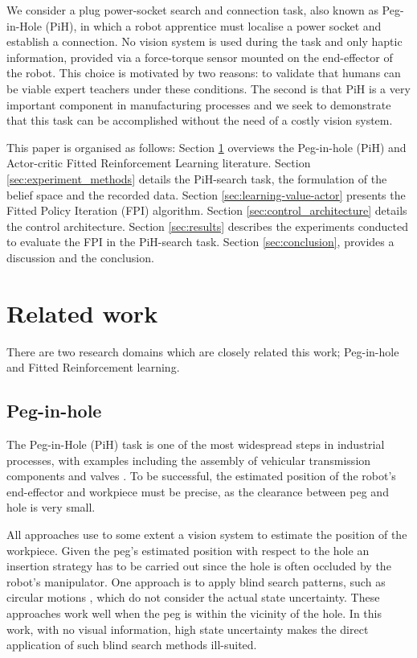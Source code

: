 \documentclass[final,5p,times,twocolumn]{elsarticle}
\begin{document}
We consider a plug power-socket search and connection task, also known as Peg-in-Hole (PiH), in which a 
robot apprentice must localise a power socket and establish a connection. 
No vision system is used during the task and only haptic information, provided via 
a force-torque sensor mounted on the end-effector of the robot. This choice is motivated by two reasons:
to validate that humans can be viable expert teachers under these conditions. The second is that PiH is a very important component 
in manufacturing processes and we seek to demonstrate that this task can be accomplished without the need of
a costly vision system. 

This paper is organised as follows: Section \ref{sec:related_work} overviews the 
Peg-in-hole (PiH) and Actor-critic Fitted Reinforcement Learning literature. Section \ref{sec:experiment_methods} 
details the PiH-search task, the formulation of the belief space and the recorded data. Section \ref{sec:learning-value-actor} presents the Fitted Policy Iteration (FPI) algorithm.
Section \ref{sec:control_architecture} details the control architecture. Section \ref{sec:results} describes the experiments 
conducted to evaluate the FPI in the PiH-search task. Section \ref{sec:conclusion}, provides a discussion and the conclusion.


\section{Related work}\label{sec:related_work}

There are two research domains which are closely related this work;
Peg-in-hole and Fitted Reinforcement learning.

\subsection{Peg-in-hole}

The Peg-in-Hole (PiH) task is one of the most widespread steps in industrial processes, 
with examples including the assembly of vehicular transmission components \cite{search_strategies_icra_2001} and 
valves \cite{online_gpr_icra_2014}. To be successful, the estimated position of the robot's end-effector 
and workpiece must be precise, as the clearance between peg and hole is very small.

All approaches use to some extent a vision system \cite{peg_personal_icra_2010} to estimate 
the position of the workpiece. Given  the peg's estimated position with respect to the hole 
an insertion strategy has to be carried out since the hole is often occluded by 
the robot's manipulator. One approach is to apply blind search patterns, such as circular 
motions \cite{search_strategies_icra_2001}, which do not consider the actual state uncertainty. 
These approaches work well when the peg is within the vicinity of the hole. In this work, with 
no visual information, high state uncertainty makes the direct application of such blind 
search methods ill-suited.
\end{document}
